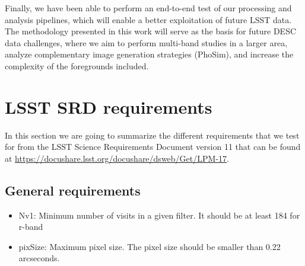 \documentclass[\docopts]{\docclass}
\begin{document}
Finally, we have been able to perform an end-to-end test of our processing and analysis pipelines, which will enable a better exploitation of future LSST data. The methodology presented in this work will serve as the basis for future DESC data challenges, where we aim to perform multi-band studies in a larger area, analyze complementary image generation strategies (PhoSim), and increase the complexity of the foregrounds included.

\appendix



\section{LSST SRD requirements}
\label{app:lsst_srd}
In this section we are going to summarize the different requirements that we test for from the LSST Science Requirements Document version 11 that can be found at \url{https://docushare.lsst.org/docushare/dsweb/Get/LPM-17}.

\subsection{General requirements}
\begin{itemize}
\item Nv1: Minimum number of visits in a given filter. It should be at least 184 for r-band
\item pixSize: Maximum pixel size. The pixel size should be smaller than 0.22 arcseconds.
\end{itemize}
\end{document}
